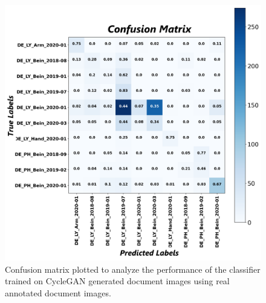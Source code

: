 \begin{figure}[H]
    \begin{center}
	\includegraphics[scale=0.25]{images/Appendix/Confusion_Matrix_CycleGAN_Generated_Data_Classifier_2021-06-02_21-55-39.png}
	\caption[Confusion matrix plotted to analyze the performance of the classifier trained on \ac{CycleGAN} generated document images using real annotated document images.]{Confusion matrix plotted to analyze the performance of the classifier trained on \ac{CycleGAN} generated document images using real annotated document images.}
	\label{fig:CMCycleganGeneratedDocumentImagesClassifier}
	\end{center}
\end{figure}


